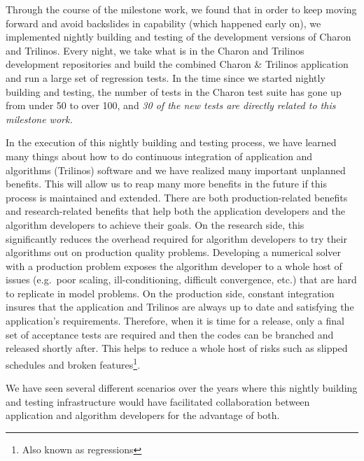 \documentclass[pdf,ps2pdf,11pt]{SANDreport}
\begin{document}
Through the course of the milestone work, we found that in order to keep
moving forward and avoid backslides in capability (which happened early on),
we implemented nightly building and testing of the development
versions of Charon and Trilinos.  Every night, we take what is in the Charon
and Trilinos development repositories and build the combined Charon \&
Trilinos application and run a large set of regression tests.  In the time
since we started nightly building and testing, the number of tests in the
Charon test suite has gone up from under 50 to over 100, and {\em 30 of the
new tests are directly related to this milestone work.}

In the execution of this nightly building and testing process, we have learned
many things about how to do continuous integration {}\cite{continuous-integration}
of application and
algorithms (Trilinos) software and we have realized many important unplanned
benefits.  This will allow us to reap many more benefits in the future if this
process is maintained
and extended.  There are both production-related benefits and research-related
benefits that help both the application developers and the algorithm
developers to achieve their goals.  On the research side, this significantly
reduces the overhead required for algorithm developers to try their algorithms
out on production quality problems.  Developing a numerical solver with a
production problem exposes the algorithm developer to a whole host of issues
(e.g.\ poor scaling, ill-conditioning, difficult convergence, etc.) that are
hard to replicate in model problems.  On the production side, constant
integration insures that the application and Trilinos are always up to date
and satisfying the application's requirements.  Therefore, when it is time for
a release, only a final set of acceptance tests are required and then the
codes can be branched and released shortly after.  This helps to reduce a
whole host of risks such as slipped schedules and broken
features\footnote{Also known as regressions}.



We have seen several different scenarios over the years where this nightly
building and testing infrastructure would have facilitated collaboration
between application and algorithm developers for the advantage of both.
\end{document}
